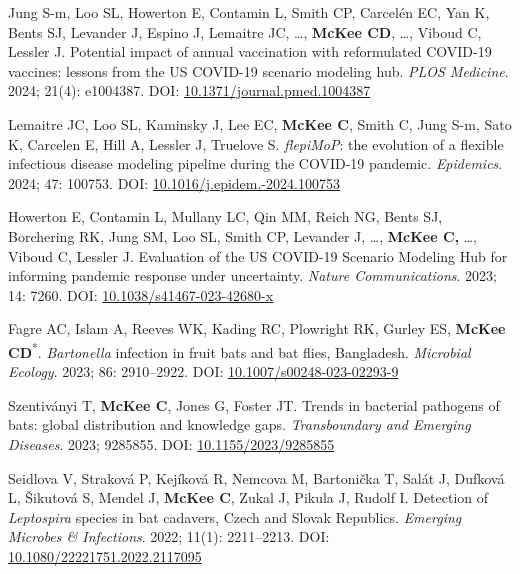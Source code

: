 \documentclass{cv}
\begin{document}
\begin{pubenum}
\item Jung S-m, Loo SL, Howerton E, Contamin L, Smith CP, Carcelén EC, Yan K, Bents SJ, Levander J, Espino J, Lemaitre JC, …, \textbf{McKee CD}, …, Viboud C, Lessler J. Potential impact of annual vaccination with reformulated COVID-19 vaccines: lessons from the US COVID-19 scenario modeling hub. \textit{PLOS Medicine}. 2024; 21(4): e1004387. DOI: \href{https://doi.org/10.1371/journal.pmed.1004387}{10.1371/journal.pmed.1004387}

\item Lemaitre JC, Loo SL, Kaminsky J, Lee EC, \textbf{McKee C}, Smith C, Jung S-m, Sato K, Carcelen E, Hill A, Lessler J, Truelove S. \textit{flepiMoP}: the evolution of a flexible infectious disease modeling pipeline during the COVID-19 pandemic. \textit{Epidemics}. 2024; 47: 100753. DOI: \href{https://doi.org/10.1016/j.epidem.2024.100753}{10.1016/j.epidem.-2024.100753}

\item Howerton E, Contamin L, Mullany LC, Qin MM, Reich NG, Bents SJ, Borchering RK, Jung SM, Loo SL, Smith CP, Levander J, …, \textbf{McKee C,} …, Viboud C, Lessler J. Evaluation of the US COVID-19 Scenario Modeling Hub for informing pandemic response under uncertainty. \textit{Nature Communications}. 2023; 14: 7260. DOI: \href{https://doi.org/10.1038/s41467-023-42680-x}{10.1038/s41467-023-42680-x}

\item Fagre AC, Islam A, Reeves WK, Kading RC, Plowright RK, Gurley ES, \textbf{McKee CD}\textsuperscript{*}. \textit{Bartonella} infection in fruit bats and bat flies, Bangladesh. \textit{Microbial Ecology}. 2023; 86: 2910--2922. DOI: \href{https://doi.org/10.1007/s00248-023-02293-9}{10.1007/s00248-023-02293-9}

\item Szentiványi T, \textbf{McKee C}, Jones G, Foster JT. Trends in bacterial pathogens of bats: global distribution and knowledge gaps. \textit{Transboundary and Emerging Diseases}. 2023; 9285855. DOI: \href{https://doi.org/10.1155/2023/9285855}{10.1155/2023/9285855}

\item Seidlova V, Straková P, Kejíková R, Nemcova M, Bartonička T, Salát J, Dufková L, Šikutová S, Mendel J, \textbf{McKee C}, Zukal J, Pikula J, Rudolf I. Detection of \textit{Leptospira} species in bat cadavers, Czech and Slovak Republics. \textit{Emerging Microbes \& Infections}. 2022; 11(1): 2211--2213. DOI: \href{https://doi.org/10.1080/22221751.2022.2117095}{10.1080/22221751.2022.2117095}


\end{pubenum}
\end{document}
